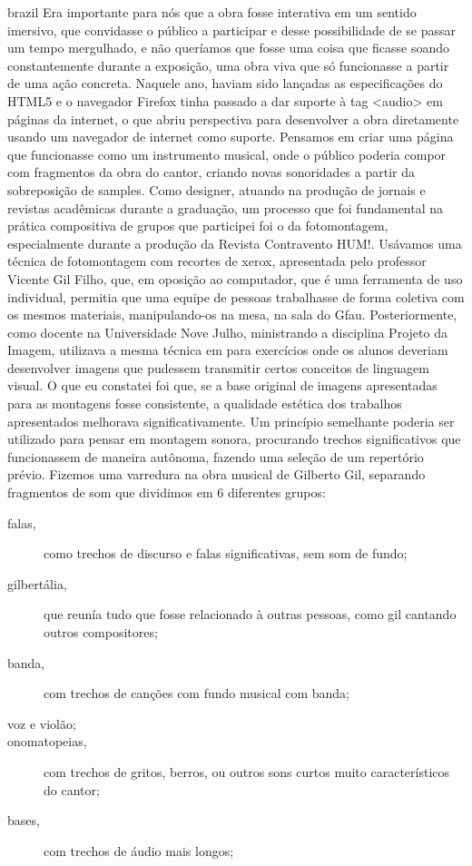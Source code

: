 \begin{otherlanguage*}{brazil}
Era importante para nós que a obra fosse interativa em um sentido imersivo, que convidasse o público a participar e desse possibilidade de se passar um tempo mergulhado, e não queríamos que fosse uma coisa que ficasse soando constantemente durante a exposição, uma obra viva que só funcionasse a partir de uma ação concreta. 
Naquele ano, haviam sido lançadas as especificações do HTML5 e o navegador Firefox tinha passado a dar suporte à tag <audio> em páginas da internet, o que abriu perspectiva para desenvolver a obra diretamente usando um navegador de internet como suporte. Pensamos em criar uma página que funcionasse como um instrumento musical, onde o público poderia compor com fragmentos da obra do cantor, criando novas sonoridades a partir da sobreposição de samples. 
Como designer, atuando na produção de jornais e revistas acadêmicas durante a graduação, um processo que foi fundamental na prática compositiva de grupos que participei foi o da fotomontagem, especialmente durante a produção da Revista Contravento HUM!. Usávamos uma técnica de fotomontagem com recortes de xerox, apresentada pelo professor Vicente Gil Filho, que, em oposição ao computador, que é uma ferramenta de uso individual, permitia que uma equipe de pessoas trabalhasse de forma coletiva com os mesmos materiais, manipulando-os na mesa, na sala do Gfau. Posteriormente, como docente na Universidade Nove Julho, ministrando a disciplina Projeto da Imagem, utilizava a mesma técnica em para exercícios onde os alunos deveriam desenvolver imagens que pudessem transmitir certos conceitos de linguagem visual. O que eu constatei foi que, se a base original de imagens apresentadas para as montagens fosse consistente, a qualidade estética dos trabalhos apresentados melhorava significativamente. 
Um princípio semelhante poderia ser utilizado para pensar em montagem sonora, procurando trechos significativos que funcionassem de maneira autônoma, fazendo uma seleção de um repertório prévio. Fizemos uma varredura na obra musical de Gilberto Gil, separando fragmentos de som que dividimos em 6 diferentes grupos: 

\begin{description}
\item[falas,]{ como trechos de discurso e falas significativas, sem som de fundo;
}
\item[gilbertália,]{ que reunía tudo que fosse relacionado à outras pessoas, como gil cantando outros compositores;
}
\item[banda,]{ com trechos de canções com fundo musical com banda;
}
\item[voz e violão;]{}
\item[onomatopeias,]{ com trechos de gritos, berros, ou outros sons curtos muito característicos do cantor;}
\item[bases,]{ com trechos de áudio mais longos; 
}


\end{description}
\end{otherlanguage*}
